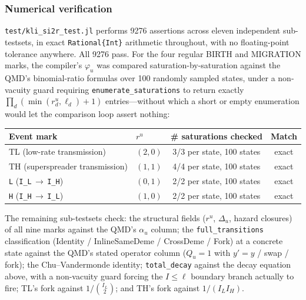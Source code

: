 \documentclass[11pt,leqno]{article}
\newcommand{\code}[1]{\texttt{#1}}
\theoremstyle{plain}
\theoremstyle{definition}
\begin{document}
\subsubsection{Numerical verification}

\code{test/kli\_si2r\_test.jl} performs 9276 assertions across eleven
independent sub-testsets, in exact \code{Rational\{Int\}} arithmetic
throughout, with no floating-point tolerance anywhere.  All 9276 pass.  For
the four regular BIRTH and MIGRATION marks, the compiler's $\varphi_u$ was
compared saturation-by-saturation against the QMD's binomial-ratio formulas
over 100 randomly sampled states, under a non-vacuity guard requiring
\code{enumerate\_saturations} to return exactly
$\prod_d (\min(r^u_d, \ell_d) + 1)$ entries---without which a short or empty
enumeration would let the comparison loop assert nothing:

\begin{center}
\renewcommand{\arraystretch}{1.15}
\begin{tabular}{llcc}
\toprule
\textbf{Event mark} & \textbf{$r^u$} &
  \textbf{\# saturations checked} & \textbf{Match} \\
\midrule
TL (low-rate transmission)   & $(2,0)$ & 3/3 per state, 100 states & exact \\
TH (superspreader transmission) & $(1,1)$ & 4/4 per state, 100 states & exact \\
\code{L} (\code{I\_L}\,$\to$\,\code{I\_H}) & $(0,1)$
  & 2/2 per state, 100 states & exact \\
\code{H} (\code{I\_H}\,$\to$\,\code{I\_L}) & $(1,0)$
  & 2/2 per state, 100 states & exact \\
\bottomrule
\end{tabular}
\end{center}

The remaining sub-testsets check: the structural fields ($r^u$, $\Delta_u$,
hazard closures) of all nine marks against the QMD's $\alpha_u$ column; the
\code{full\_transitions} classification
(Identity / InlineSameDeme / CrossDeme / Fork) at a concrete state against
the QMD's stated operator column ($Q_u = 1$ with $y' = y$ / swap / fork);
the Chu--Vandermonde identity; \code{total\_decay} against the decay
equation above, with a non-vacuity guard forcing the $I \le \ell$ boundary
branch actually to fire; TL's fork against $1/\binom{I_L}{2}$; and TH's fork
against $1/(I_L I_H)$.
\end{document}
